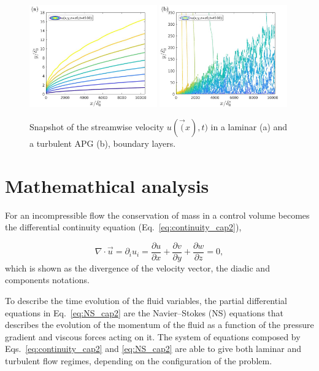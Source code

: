 \begin{figure}[h!]
\centering
\includegraphics[width=0.49\textwidth ]{APG_laminar.jpg}
\includegraphics[width=0.49\textwidth]{APG_turb.jpg}
\caption{ \label{fig:lam_turb_development} Snapshot of the streamwise velocity $u(\vec(x), t)$ in a laminar (a) and a turbulent APG (b), boundary layers.
   }
\end{figure}



\section{Mathemathical analysis}

For an incompressible flow the conservation of mass in a control volume becomes the differential continuity equation (Eq.~\ref{eq:continuity_cap2}),

\begin{equation}
\label{eq:continuity_cap2}
    \nabla \cdot \vec{u} = \partial_i u_i = 
    \frac{\partial u}{\partial x} + \frac{\partial v}{\partial y} + \frac{\partial w}{\partial z} = 0,
\end{equation}
which is shown as the divergence of the velocity vector, the diadic and components notations.

To describe the time evolution of the fluid variables, the partial differential equations in Eq.~\ref{eq:NS_cap2} are the Navier--Stokes (NS) equations that describes the evolution of the momentum of the fluid as a function of the pressure gradient and viscous forces acting on it. The system of equations composed by Eqs.~\ref{eq:continuity_cap2} and \ref{eq:NS_cap2} are able to give both laminar and turbulent flow regimes, depending on the configuration of the problem.


